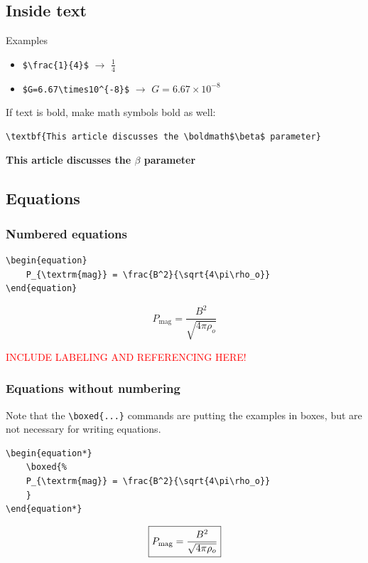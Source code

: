 \documentclass{article}
\begin{document}
\subsection{Inside text}
Examples
\begin{itemize}
    \item \verb|$\frac{1}{4}$| $\rightarrow$ $\frac{1}{4}$
    \item \verb|$G=6.67\times10^{-8}$| $\rightarrow$
        $G=6.67\times10^{-8}$
\end{itemize}
If text is bold, make math symbols bold as well:
\begin{verbatim}
\textbf{This article discusses the \boldmath$\beta$ parameter}
\end{verbatim}
\textbf{This article discusses the \boldmath$\beta$ parameter}

\subsection{Equations}
\subsubsection{Numbered equations}
\begin{verbatim}
\begin{equation}
    P_{\textrm{mag}} = \frac{B^2}{\sqrt{4\pi\rho_o}}
\end{equation}
\end{verbatim}

\begin{equation}
    \boxed{P_{\textrm{mag}} = \frac{B^2}{\sqrt{4\pi\rho_o}}}
\end{equation}

\textcolor{red}{INCLUDE LABELING AND REFERENCING HERE!}

\subsubsection{Equations without numbering}
Note that the \verb|\boxed{...}| commands are putting the examples
in boxes, but are not necessary for writing equations.
\begin{verbatim}
\begin{equation*}
    \boxed{%
    P_{\textrm{mag}} = \frac{B^2}{\sqrt{4\pi\rho_o}}
    }
\end{equation*}
\end{verbatim}
\begin{equation*}
    \boxed{%
    P_{\textrm{mag}} = \frac{B^2}{\sqrt{4\pi\rho_o}}
    }
\end{equation*}
\end{document}
